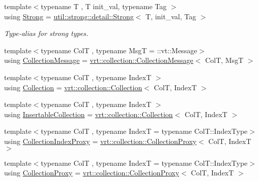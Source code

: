 \begin{DoxyCompactItemize}
\item 
{\footnotesize template$<$typename T , T init\+\_\+val, typename Tag $>$ }\\using \hyperlink{namespacevt_adbd3338278905742eb2de6db590fd2f1}{Strong} = \hyperlink{structvt_1_1util_1_1strong_1_1detail_1_1_strong}{util\+::strong\+::detail\+::\+Strong}$<$ T, init\+\_\+val, Tag $>$
\begin{DoxyCompactList}\small\item\em Type-\/alias for strong types. \end{DoxyCompactList}\item 
{\footnotesize template$<$typename ColT , typename MsgT  = \+::vt\+::\+Message$>$ }\\using \hyperlink{namespacevt_ae7700e12f79c0fec16964aab84838428}{Collection\+Message} = \hyperlink{structvt_1_1vrt_1_1collection_1_1_collection_message}{vrt\+::collection\+::\+Collection\+Message}$<$ ColT, MsgT $>$
\item 
{\footnotesize template$<$typename ColT , typename IndexT $>$ }\\using \hyperlink{namespacevt_ac72e048964e4bb536faaa8bc90f58db7}{Collection} = \hyperlink{structvt_1_1vrt_1_1collection_1_1_collection}{vrt\+::collection\+::\+Collection}$<$ ColT, IndexT $>$
\item 
{\footnotesize template$<$typename ColT , typename IndexT $>$ }\\using \hyperlink{namespacevt_a3fe0bbd9abf8f98d69d9f73c9f89e0a5}{Insertable\+Collection} = \hyperlink{structvt_1_1vrt_1_1collection_1_1_collection}{vrt\+::collection\+::\+Collection}$<$ ColT, IndexT $>$
\item 
{\footnotesize template$<$typename ColT , typename IndexT  = typename Col\+T\+::\+Index\+Type$>$ }\\using \hyperlink{namespacevt_a2be17f5dafb626fe9f58d762b6aad2f0}{Collection\+Index\+Proxy} = \hyperlink{structvt_1_1vrt_1_1collection_1_1_collection_proxy}{vrt\+::collection\+::\+Collection\+Proxy}$<$ ColT, IndexT $>$
\item 
{\footnotesize template$<$typename ColT , typename IndexT  = typename Col\+T\+::\+Index\+Type$>$ }\\using \hyperlink{namespacevt_a0d58a693bfb96e0ce5d145692a1a1f98}{Collection\+Proxy} = \hyperlink{structvt_1_1vrt_1_1collection_1_1_collection_proxy}{vrt\+::collection\+::\+Collection\+Proxy}$<$ ColT, IndexT $>$
\end{DoxyCompactItemize}
